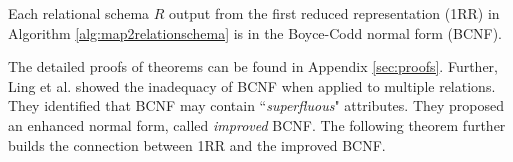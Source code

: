  







\begin{theorem} 
Each relational schema $R$ output from the first reduced representation (1RR) in Algorithm  \ref{alg:map2relationschema} is in the Boyce-Codd normal form (BCNF). \label{theo:BCNF}
\end{theorem}












The detailed proofs of theorems can be found in Appendix \ref{sec:proofs}. Further, Ling et al. \cite{journals/tods/LingTK81} showed the inadequacy of BCNF  when applied to multiple relations. They identified that BCNF may contain ``\textit{superfluous}"  attributes. They proposed an enhanced normal form, called \textit{improved} BCNF. The following theorem further builds the connection between 1RR and the improved BCNF.




